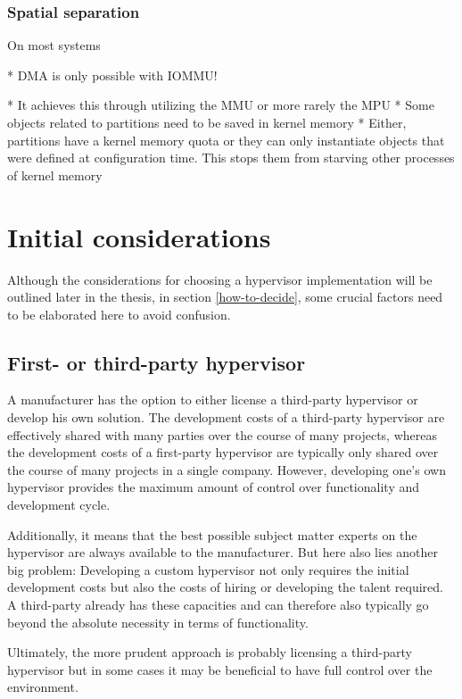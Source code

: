 \subsubsection{Spatial separation}
On most systems 

* DMA is only possible with IOMMU!

* It achieves this through utilizing the MMU or more rarely the MPU
* Some objects related to partitions need to be saved in kernel memory
* Either, partitions have a kernel memory quota or they can only instantiate objects that were defined at configuration time. This stops them from starving other processes of kernel memory

\section{Initial considerations}
Although the considerations for choosing a hypervisor implementation will be outlined later in the thesis, in section \ref{how-to-decide}, some crucial factors need to be elaborated here to avoid confusion.
\subsection{First- or third-party hypervisor}
A manufacturer has the option to either license a third-party hypervisor or develop his own solution. The development costs of a third-party hypervisor are effectively shared with many parties over the course of many projects, whereas the development costs of a first-party hypervisor are typically only shared over the course of many projects in a single company. However, developing one's own hypervisor provides the maximum amount of control over functionality and development cycle.

Additionally, it means that the best possible subject matter experts on the hypervisor are always available to the manufacturer. But here also lies another big problem: Developing a custom hypervisor not only requires the initial development costs but also the costs of hiring or developing the talent required. A third-party already has these capacities and can therefore also typically go beyond the absolute necessity in terms of functionality.

Ultimately, the more prudent approach is probably licensing a third-party hypervisor but in some cases it may be beneficial to have full control over the environment. 

